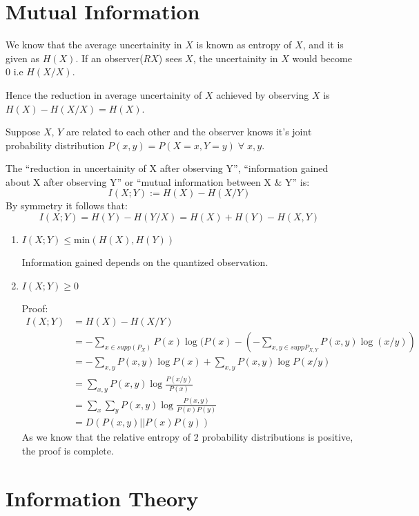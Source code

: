 \documentclass{article}
\begin{document}
\section{Mutual Information}

We know that the average uncertainity in $X$ is known as entropy of $X$, and it is given as $H(X)$.
If an observer($RX$) sees $X$, the uncertainity in $X$ would become 0 i.e $H(X/X)$.

Hence the reduction in average uncertainity of $X$ achieved by observing $X$ is $H(X)-H(X/X)=H(X)$.

Suppose $X,\, Y$ are related to each other and the observer knows it's joint probability distribution $P(x,y)=P(X=x,Y=y) \; \forall \;  x,y$.

The ``reduction in uncertainity of X after observing Y'', ``information gained about X after observing Y'' or ``mutual information between X \& Y'' is:
$$I(X;Y):=H(X)-H(X/Y)$$
By symmetry it follows that:
$$I(X;Y)=H(Y)-H(Y/X)=H(X)+H(Y)-H(X,Y)$$

\begin{enumerate}
    \item $ I(X;Y) \leq \text{min} (H(X),H(Y))$

    Information gained depends on the quantized observation.

    \item $I(X;Y) \geq 0$

    Proof:
    \begin{align*}
        I(X;Y) &= H(X)-H(X/Y) \\
        &= - \sum_{x \in supp(P_X)} P(x)\log(P(x) - \left( - \sum_{x,y \in supp P_{X,Y}} P(x,y) \log (x/y)\right) \\
        &= - \sum_{x,y} P(x,y)\log P(x) + \sum_{x,y} P(x,y)\log P(x/y) \\
        &= \sum_{x,y} P(x,y)\log \frac{P(x/y)}{P(x)} \\
        &= \sum_{x} \sum_{y} P(x,y)\log \frac{P(x,y)}{P(x)P(y)} \\
        &= D(P(x,y)||P(x)P(y))
    \end{align*}
    As we know that the relative entropy of 2 probability distributions is positive, the proof is complete.
\end{enumerate}

\section{Information Theory}
\end{document}
